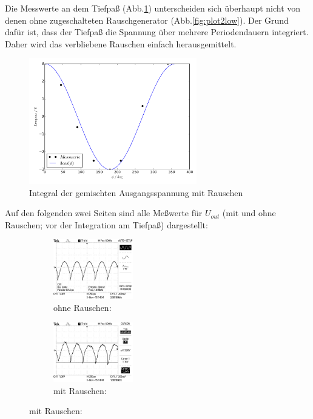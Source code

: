 Die Messwerte an dem Tiefpaß (Abb.\ref{fig:plot3low}) unterscheiden sich
überhaupt nicht von denen ohne zugeschalteten
Rauschgenerator (Abb.\ref{fig:plot2low}).
Der Grund dafür ist, dass der Tiefpaß die Spannung über mehrere
Periodendauern integriert. Daher wird das verbliebene Rauschen einfach
herausgemittelt.
\begin{figure}[H]
  \centering
  \includegraphics[width=0.65\textwidth, height=0.35\textwidth]{plot3low.pdf}
  \caption{Integral der gemischten Ausgangsspannung mit Rauschen}
  \label{fig:plot3low}
\end{figure}
Auf den folgenden zwei Seiten sind alle Meßwerte für $U_{out}$
(mit und ohne Rauschen; vor der Integration am Tiefpaß) dargestellt:
\newpage
\hspace{-3cm}
\captionsetup{labelformat=empty}
\begin{figure}[H]
  \caption*{$U_{out} ( \phi = 0°$) }
  \centering
  \begin{subfigure}{0.48\textwidth}
      \centering
      \caption*{ohne Rauschen:}
      \includegraphics[angle=90,height=2.6cm]{graphics/ALL0031/F0031TEK.jpg}
  \end{subfigure}
  \begin{subfigure}{0.48\textwidth}
      \centering
      \caption*{mit Rauschen:}
      \includegraphics[angle=90,height=2.6cm]{graphics/ALL0039/F0039TEK.jpg}
  \end{subfigure}
\end{figure}
\addtocounter{figure}{-1}
